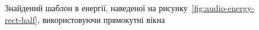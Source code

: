 \begin{figure}[!h]

            \caption{Знайдений шаблон в енергії, наведеної на рисунку~\ref{fig:audio-energy-rect-half}, використовуючи
                прямокутні вікна}\label{fig:matched-energy-rect-half-rect}
        \end{figure}

